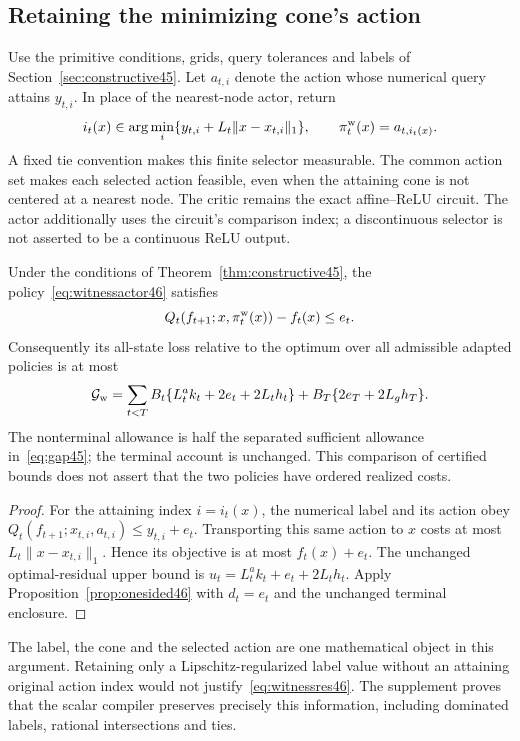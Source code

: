 \subsection{Retaining the minimizing cone's action}
Use the primitive conditions, grids, query tolerances and labels of Section~\ref{sec:constructive45}. Let $a_{t,i}$ denote the action whose numerical query attains $y_{t,i}$. In place of the nearest-node actor, return
\begin{equation}\label{eq:witnessactor46}
 i_t(x)\in\arg\min_i\{y_{t,i}+L_t\|x-x_{t,i}\|_1\},
 \qquad \pi_t^{\rm w}(x)=a_{t,i_t(x)}.
\end{equation}
A fixed tie convention makes this finite selector measurable. The common action set makes each selected action feasible, even when the attaining cone is not centered at a nearest node. The critic remains the exact affine--ReLU circuit. The actor additionally uses the circuit's comparison index; a discontinuous selector is not asserted to be a continuous ReLU output.

\begin{theorem}\label{thm:witness46}
Under the conditions of Theorem~\ref{thm:constructive45}, the policy~\eqref{eq:witnessactor46} satisfies
\begin{equation}\label{eq:witnessres46}
 Q_t(f_{t+1};x,\pi_t^{\rm w}(x))-f_t(x)\le e_t.
\end{equation}
Consequently its all-state loss relative to the optimum over all admissible adapted policies is at most
\begin{equation}\label{eq:witnessgap46}
 \mathcal G_{\rm w}=
 \sum_{t<T}B_t\{L_t^ak_t+2e_t+2L_th_t\}
       +B_T\{2e_T+2L_gh_T\}.
\end{equation}
The nonterminal allowance is half the separated sufficient allowance in~\eqref{eq:gap45}; the terminal account is unchanged. This comparison of certified bounds does not assert that the two policies have ordered realized costs.
\end{theorem}
\begin{proof}
For the attaining index $i=i_t(x)$, the numerical label and its action obey $Q_t(f_{t+1};x_{t,i},a_{t,i})\le y_{t,i}+e_t$. Transporting this same action to $x$ costs at most $L_t\|x-x_{t,i}\|_1$. Hence its objective is at most $f_t(x)+e_t$. The unchanged optimal-residual upper bound is $u_t=L_t^ak_t+e_t+2L_th_t$. Apply Proposition~\ref{prop:onesided46} with $d_t=e_t$ and the unchanged terminal enclosure.
\end{proof}
The label, the cone and the selected action are one mathematical object in this argument. Retaining only a Lipschitz-regularized label value without an attaining original action index would not justify~\eqref{eq:witnessres46}. The supplement proves that the scalar compiler preserves precisely this information, including dominated labels, rational intersections and ties.

